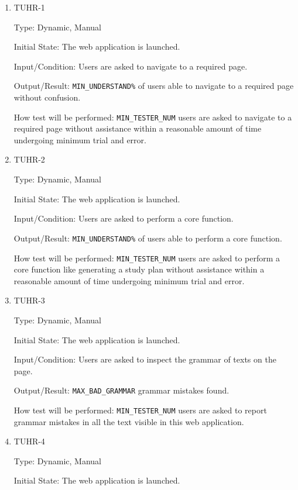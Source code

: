 \documentclass[12pt, titlepage]{article}
\begin{document}
\begin{enumerate}
\item{TUHR-1\\}\label{TUHR-1}

Type: Dynamic, Manual
					
Initial State: The web application is launched.
					
Input/Condition: Users are asked to navigate to a required page.
					
Output/Result: \texttt{MIN\_UNDERSTAND\%} of users able to navigate to a required page without confusion.
					
How test will be performed: \texttt{MIN\_TESTER\_NUM} users are asked to navigate to a required page without assistance within a reasonable amount of time undergoing minimum trial and error.

\item{TUHR-2\\}\label{TUHR-2}

Type: Dynamic, Manual
					
Initial State: The web application is launched.
					
Input/Condition: Users are asked to perform a core function.
					
Output/Result: \texttt{MIN\_UNDERSTAND\%} of users able to perform a core function.
					
How test will be performed: \texttt{MIN\_TESTER\_NUM} users are asked to perform a core function like generating a study plan without assistance within a reasonable amount of time undergoing minimum trial and error.
\item{TUHR-3\\}\label{TUHR-3}

Type: Dynamic, Manual
					
Initial State: The web application is launched.
					
Input/Condition: Users are asked to inspect the grammar of texts on the page.
					
Output/Result: \texttt{MAX\_BAD\_GRAMMAR} grammar mistakes found.
					
How test will be performed: \texttt{MIN\_TESTER\_NUM} users are asked to report grammar mistakes in all the text visible in this web application.

\item{TUHR-4\\}\label{TUHR-4}

Type: Dynamic, Manual
					
Initial State: The web application is launched.
					

\end{enumerate}
\end{document}
